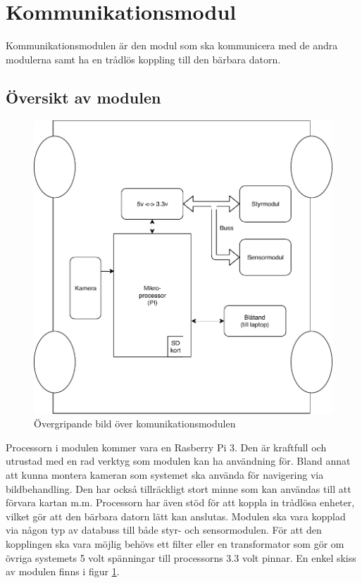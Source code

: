 \documentclass[systemskiss/skiss.tex]{subfiles}
\begin{document}
\section{Kommunikationsmodul}
Kommunikationsmodulen är den modul som ska kommunicera med de andra modulerna samt ha en trådlös koppling till den bärbara datorn. 
\subsection{Översikt av modulen}
\begin{figure}[h]
    \centering
    \includegraphics[width=0.6\linewidth]{systemskiss/figures/kommodul.pdf}
    \caption{Övergripande bild över komunikationsmodulen}
    \label{fig:komskiss}
\end{figure}
Processorn i modulen kommer vara en Rasberry Pi 3. Den är kraftfull och utrustad med en rad verktyg som modulen kan ha användning för. Bland annat att kunna montera kameran som systemet ska använda för navigering via bildbehandling. Den har också tillräckligt stort minne som kan användas till att förvara kartan m.m. Processorn har även stöd för att koppla in trådlösa enheter, vilket gör att den bärbara datorn lätt kan anslutas. Modulen ska vara kopplad via någon typ av databuss till både styr- och sensormodulen. För att den kopplingen  ska vara möjlig behövs ett filter eller en transformator som gör om övriga systemets 5 volt spänningar till processorns 3.3 volt pinnar. En enkel skiss av modulen finns i figur \ref{fig:komskiss}.
\end{document}
